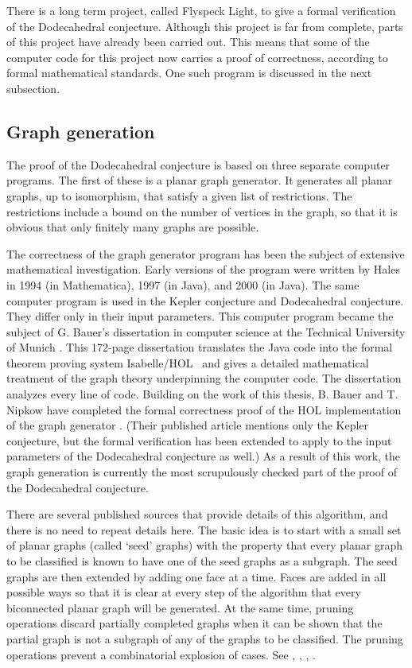 \documentclass{article} %
\begin{document}
There is a long term project, called Flyspeck Light, to give a formal
verification of the Dodecahedral conjecture. Although this project is
far from complete, parts of this project have already been carried
out. This means that some of the computer code for this project now
carries a proof of correctness, according to formal mathematical
standards. One such program is discussed in the next subsection.

\subsection{Graph generation}
\label{sec:gg}

The proof of the Dodecahedral conjecture is based on three separate
computer programs. The first of these is a planar graph generator. It
generates all planar graphs, up to isomorphism, that satisfy a given
list of restrictions. The restrictions include a bound on the number
of vertices in the graph, so that it is obvious that only finitely
many graphs are possible.

The correctness of the graph generator program has been the subject of
extensive mathematical investigation. Early versions of the program
were written by Hales in 1994 (in Mathematica),
1997 (in Java), and 2000 (in Java). The same computer
program is used in the Kepler conjecture and Dodecahedral conjecture.
They differ only in their input parameters. This computer program
became the subject of G. Bauer's dissertation in computer science at
the Technical University of Munich \cite{Bauer:2006:Thesis}. This
172-page dissertation translates the Java code into the formal theorem
proving system Isabelle/HOL~\cite{Paulson:1994:Isabelle} and gives a
detailed mathematical treatment of the graph theory underpinning the
computer code. The dissertation analyzes every line of code. Building
on the work of this thesis, B. Bauer and T. Nipkow have completed the
formal correctness proof of the HOL implementation of the graph
generator \cite{Nipkow:2005:Tame}. (Their published article mentions
only the Kepler conjecture, but the formal verification has been
extended to apply to the input parameters of the Dodecahedral
conjecture as well.) As a result of this work, the graph generation is
currently the most scrupulously checked part of the proof of the
Dodecahedral conjecture.

There are several published sources that provide details of this
algorithm, and there is no need to repeat details here. The basic idea
is to start with a small set of planar graphs (called `seed' graphs)
with the property that every planar graph to be classified is known to
have one of the seed graphs as a subgraph. The seed graphs are then
extended by adding one face at a time. Faces are added in all possible
ways so that it is clear at every step of the algorithm that every
biconnected planar graph will be generated. At the same time, pruning
operations discard partially completed graphs when it can be shown
that the partial graph is not a subgraph of any of the graphs to be
classified. The pruning operations prevent a combinatorial explosion
of cases. See \cite[\S5]{Hales:2003:DCG}, \cite[\S19]{Hales:2006:DCG},
\cite{Bauer:2006:Thesis}, \cite{Nipkow:2005:Tame}.
\end{document}
